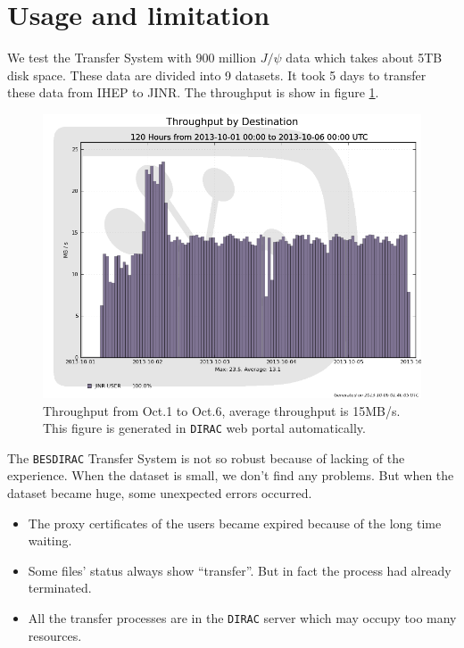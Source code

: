 \section{Usage and limitation}
We test the Transfer System with 900 million $J/\psi$ data 
which takes about 5TB disk space. 
These data are divided into 9 datasets.
It took 5 days to transfer 
these data from IHEP to JINR. The throughput is show in 
figure \ref{fig:throughput}.

\begin{figure}[h]
\includegraphics[width=.6\textwidth, keepaspectratio]{data/throughput-dest-1001-10-06.png}
\begin{minipage}[b]{.4\textwidth}
    \caption{\label{fig:throughput}Throughput from Oct.1 to Oct.6, 
    average throughput is 15MB/s. This figure is generated in 
{\tt DIRAC} web portal automatically.}
\end{minipage}
\end{figure}

The {\tt BESDIRAC} Transfer System is not so robust
because of lacking of the experience.
When the dataset is small, we don't find any problems.
But when the dataset became huge, some unexpected errors occurred.
\begin{itemize}
    \item The proxy certificates of the users became expired
            because of the long time waiting.
    \item Some files' status always show ``transfer''.
            But in fact the process had already terminated.
    \item All the transfer processes are in the {\tt DIRAC} server
            which may occupy too many resources.
\end{itemize}
